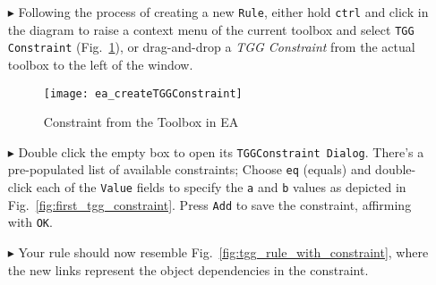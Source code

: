 \begin{enumerate}
\newpage

Believe it or not, our rule \emph{already} creates a \texttt{Box}, \texttt{Dictionary}, and correspondence link between them at the same time, as-is!
Unfortunately, this only creates the objects, and doesn't relate any of their attributes. Why don't we try to connect the \texttt{name} of the \texttt{box} to
the \texttt{title} of the dictionary so that they always match? 

For this, we can once again use \emph{attribute constraints}!\footnote{First defined in Part III, Section 4} When used with TGG rules, attribute constraints
provide a bidirectional and high-level solution for attribute manipulation. We're looking for a constraint which ensures that \texttt{box.name} and
\texttt{dictionary.title} are consistent.

\vspace{0.5cm}

\item[$\blacktriangleright$] Following the process of creating a new \texttt{Rule}, either hold \texttt{ctrl} and click in the diagram to raise a context menu
of the current toolbox and select \texttt{TGG Constraint} (Fig.~\ref{fig:common_toolbox}), or drag-and-drop a \emph{TGG Constraint} from the actual toolbox to
the left of the window.

\vspace{0.5cm}

\begin{figure}[htbp]
\begin{center}
  \texttt{[image: ea\_createTGGConstraint]}
  \caption{Constraint from the Toolbox in EA}
  \label{fig:common_toolbox}
\end{center}
\end{figure}

\item[$\blacktriangleright$] Double click the empty box to open its \texttt{TGGConstraint Dialog}. There's a pre-populated list of available constraints; Choose
\texttt{eq} (equals) and double-click each of the \texttt{Value} fields to specify the \texttt{a} and \texttt{b} values as depicted in
Fig.~\ref{fig:first_tgg_constraint}. Press \texttt{Add} to save the constraint, affirming with \texttt{OK}.

\item[$\blacktriangleright$] Your rule should now resemble Fig.~\ref{fig:tgg_rule_with_constraint}, where the new links represent the object dependencies in the
constraint.


\end{enumerate}
